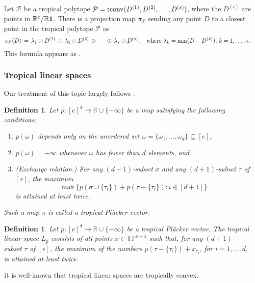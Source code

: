 \documentclass[12pt]{extarticle}
\numberwithin{theorem}{section}
\newtheorem{definition}[theorem]{Definition}
\newcommand{\RR}{\mathbb{R}}
\begin{document}
Let $\mathcal P$ be a tropical polytope
$\mathcal{P} = {\rm tconv}(D^{(1)},D^{(2)},\ldots,D^{(s)})$, where the $D^{(i)}$ are points in $\RR^e/\RR {\bf 1}$. There is a projection map $\pi_{\mathcal P}$ sending any point $D$ to a closest point in the tropical polytope $\mathcal{P}$ as
\begin{equation}
\label{eq:tropproj} %
 \pi_\mathcal{P} (D) \,= \,
\lambda_1 \odot  D^{(1)} \,\oplus \,
\lambda_2 \odot  D^{(2)} \,\oplus \, \cdots \,\oplus \,
\lambda_s \odot  D^{(s)}  ,
\quad {\rm where} \,\, \lambda_k = {\rm min}(D-D^{(k)}) , \,
 k = 1,\ldots,s.
\end{equation}
This formula appears as \cite[Formula 5.2.3]{MS}.

\subsubsection{Tropical linear spaces}

Our treatment of this topic largely follows \cite[Sections 3 and 4]{JSY}.

\begin{definition}
Let $p:[e]^d\to \RR\cup\{-\infty\}$ be a map satisfying the following conditions:
\begin{enumerate}
	\item $p(\omega)$ depends only on the unordered set $\omega=\{\omega_1,\ldots,\omega_d\}\subseteq [e]$,
	\item $p(\omega)=-\infty$ whenever $\omega$ has fewer than $d$ elements, and
	\item({Exchange relation}.) For any $(d-1)$-subset $\sigma$ and any $(d+1)$-subset $\tau$ of $[e]$, the maximum
	\[\max\{p(\sigma\cup\{\tau_i\})+p(\tau-\{\tau_i\}):i\in[d+1]\}\]
	is attained at least twice.
\end{enumerate}
Such a map $\pi$ is called a \emph{tropical Pl\"ucker vector}.
\end{definition}

\begin{definition}
Let $p:[e]^d\to  \RR\cup\{-\infty\}$ be a tropical Pl\"ucker vector. The \emph{tropical linear space} $L_p$ consists of all points $x\in \mathbb T\mathbb P^{e-1}$ such that, for any $(d+1)$-subset $\tau$ of $[e]$, the maximum of the numbers $p(\tau-\{\tau_i\})+x_{\tau_i}$, for $i=1,\ldots, d$, is attained at least twice.
\end{definition}

It is well-known \cite[Proposition 5.2.8]{MS} that tropical linear spaces are tropically convex. 
\end{document}
